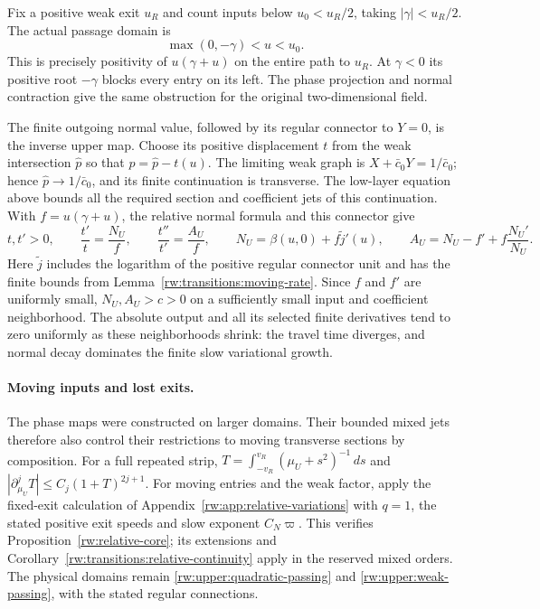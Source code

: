 Fix a positive weak exit $u_R$ and count inputs below
$u_0<u_R/2$, taking $|\gamma|<u_R/2$. The actual passage domain is
\begin{equation}\label{rw:upper:weak-passing}
 \max(0,-\gamma)<u<u_0.
\end{equation}
This is precisely positivity of $u(\gamma+u)$ on the entire path to
$u_R$. At $\gamma<0$ its positive root $-\gamma$ blocks every entry
on its left. The phase projection and normal contraction give the
same obstruction for the original two-dimensional field.

The finite outgoing normal value, followed by its regular connector
to $Y=0$, is the inverse upper map. Choose its positive displacement
$t$ from the weak intersection $\hat p$ so that $p=\hat p-t(u)$.
The limiting weak graph is $X+\bar c_0Y=1/\bar c_0$; hence
$\hat p\to1/\bar c_0$, and its finite continuation is transverse.
The low-layer equation above bounds all the required section and
coefficient jets of this continuation. With $f=u(\gamma+u)$, the
relative normal formula and this connector give
\begin{equation}\label{rw:upper:weak-rate}
 t,t'>0,\qquad
 \frac{t'}t=\frac{N_U}{f},\qquad
 \frac{t''}{t'}=\frac{A_U}{f},\qquad
 N_U=\beta(u,0)+f\widetilde j'(u),\qquad
 A_U=N_U-f'+f\frac{N_U'}{N_U}.
\end{equation}
Here $\widetilde j$ includes the logarithm of the positive regular
connector unit and has the finite bounds from
Lemma~\ref{rw:transitions:moving-rate}. Since $f$ and $f'$ are
uniformly small, $N_U,A_U>c>0$ on a sufficiently small input and
coefficient neighborhood. The absolute output and all its selected
finite derivatives tend to zero uniformly as these neighborhoods
shrink: the travel time diverges, and normal decay dominates the
finite slow variational growth.

\paragraph{Moving inputs and lost exits.}
The phase maps were constructed on larger domains.  Their bounded
mixed jets therefore also control their restrictions to moving
transverse sections by composition.  For a full
repeated strip,
$T=\int_{-v_R}^{v_R}(\mu_U+s^2)^{-1}\,ds$ and
$|\partial_{\mu_U}^jT|\le C_j(1+T)^{2j+1}$.
For moving entries and the weak factor, apply the fixed-exit calculation
of Appendix~\ref{rw:app:relative-variations} with $q=1$, the stated
positive exit speeds and slow exponent $C_N\varpi$. This verifies
Proposition~\ref{rw:relative-core}; its extensions and
Corollary~\ref{rw:transitions:relative-continuity} apply in the reserved
mixed orders. The physical domains
remain \eqref{rw:upper:quadratic-passing} and
\eqref{rw:upper:weak-passing}, with the stated regular connections.
